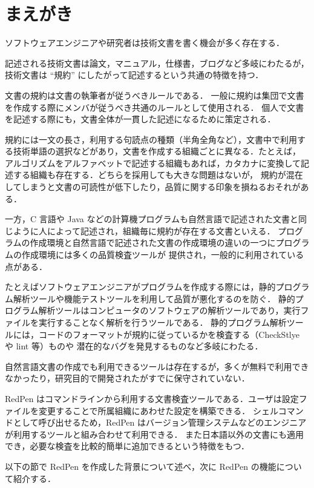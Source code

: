 \section{まえがき}

ソフトウェアエンジニアや研究者は技術文書を書く機会が多く存在する．

記述される技術文書は論文，マニュアル，仕様書，ブログなど多岐にわたるが，技術文書は ``規約'' にしたがって記述するという共通の特徴を持つ．

文書の規約は文書の執筆者が従うべきルールである．
一般に規約は集団で文書を作成する際にメンバが従うべき共通のルールとして使用される．
個人で文書を記述する際にも，文書全体が一貫した記述になるために策定される．

規約には一文の長さ，利用する句読点の種類（半角全角など），文書中で利用する技術単語の選択などがあり，文書を作成する組織ごとに異なる．たとえば，
アルゴリズムをアルファベットで記述する組織もあれば，カタカナに変換して記述する組織も存在する．どちらを採用しても大きな問題はないが，
規約が混在してしまうと文書の可読性が低下したり，品質に関する印象を損ねるおそれがある．

一方，C 言語や Java などの計算機プログラムも自然言語で記述された文書と同じように人によって記述され，組織毎に規約が存在する文書といえる．
プログラムの作成環境と自然言語で記述された文書の作成環境の違いの一つにプログラムの作成環境には多くの品質検査ツールが
提供され，一般的に利用されている点がある．

たとえばソフトウェアエンジニアがプログラムを作成する際には，静的プログラム解析ツールや機能テストツールを利用して品質が悪化するのを防ぐ．
静的プログラム解析ツールはコンピュータのソフトウェアの解析ツールであり，実行ファイルを実行することなく解析を行うツールである．
静的プログラム解析ツールには，コードのフォーマットが規約に従っているかを検査する（CheckStlye~\cite{checkstyle} や lint 等）ものや
潜在的なバグを発見するものなど多岐にわたる．

自然言語文書の作成でも利用できるツールは存在するが，多くが無料で利用できなかったり，研究目的で開発されたがすでに保守されていない．

RedPen はコマンドラインから利用する文書検査ツールである．ユーザは設定ファイルを変更することで所属組織にあわせた設定を構築できる．
シェルコマンドとして呼び出せるため，RedPen はバージョン管理システムなどのエンジニアが利用するツールと組み合わせて利用できる．
また日本語以外の文書にも適用でき，必要な検査を比較的簡単に追加できるという特徴をもつ．

以下の節で RedPen を作成した背景について述べ，次に RedPen の機能について紹介する．

